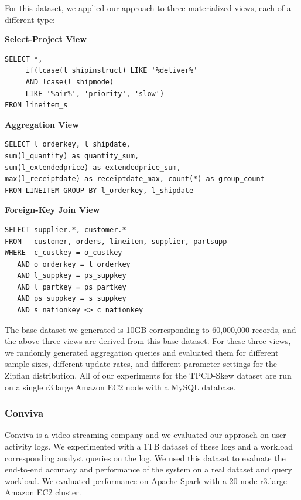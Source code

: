 For this dataset, we applied our approach to three materialized views, each of a different type:
\vspace{1em}

\textbf{Select-Project View}
\begin{lstlisting}
SELECT *, 
     if(lcase(l_shipinstruct) LIKE '%deliver%' 
     AND lcase(l_shipmode) 
     LIKE '%air%', 'priority', 'slow') 
FROM lineitem_s
\end{lstlisting}

\vspace{1em}

\textbf{Aggregation View}
\begin{lstlisting}
SELECT l_orderkey, l_shipdate, 
sum(l_quantity) as quantity_sum, 
sum(l_extendedprice) as extendedprice_sum, 
max(l_receiptdate) as receiptdate_max, count(*) as group_count 
FROM LINEITEM GROUP BY l_orderkey, l_shipdate
\end{lstlisting}

\vspace{1em}

\textbf{Foreign-Key Join View}
\begin{lstlisting}
SELECT supplier.*, customer.* 
FROM   customer, orders, lineitem, supplier, partsupp 
WHERE  c_custkey = o_custkey 
   AND o_orderkey = l_orderkey 
   AND l_suppkey = ps_suppkey 
   AND l_partkey = ps_partkey 
   AND ps_suppkey = s_suppkey 
   AND s_nationkey <> c_nationkey
\end{lstlisting}

\vspace{1em}

The base dataset we generated is 10GB corresponding to 60,000,000 records, and the above three views are derived from this base dataset.
For these three views, we randomly generated aggregation queries and evaluated them for different sample sizes, different update rates, and different parameter settings for the Zipfian distribution.
All of our experiments for the TPCD-Skew dataset are run on a single r3.large Amazon EC2 node with a MySQL database.

\subsubsection{Conviva}
Conviva is a video streaming company and we evaluated our approach on user activity logs. 
We experimented with a 1TB dataset of these logs and a workload corresponding analyst queries on the log.
We used this dataset to evaluate the end-to-end accuracy and performance of the system on a real dataset and query workload.
We evaluated performance on Apache Spark with a 20 node r3.large Amazon EC2 cluster. 


